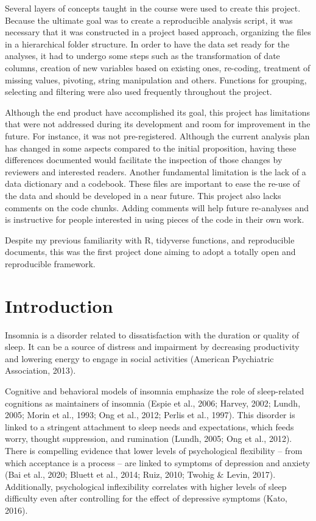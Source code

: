 \documentclass[
  letterpaper,
  DIV=11,
  numbers=noendperiod]{scrreprt}
\begin{document}

Several layers of concepts taught in the course were used to create this
project. Because the ultimate goal was to create a reproducible analysis
script, it was necessary that it was constructed in a project based
approach, organizing the files in a hierarchical folder structure. In
order to have the data set ready for the analyses, it had to undergo
some steps such as the transformation of date columns, creation of new
variables based on existing ones, re-coding, treatment of missing
values, pivoting, string manipulation and others. Functions for
grouping, selecting and filtering were also used frequently throughout
the project.

Although the end product have accomplished its goal, this project has
limitations that were not addressed during its development and room for
improvement in the future. For instance, it was not pre-registered.
Although the current analysis plan has changed in some aspects compared
to the initial proposition, having these differences documented would
facilitate the inspection of those changes by reviewers and interested
readers. Another fundamental limitation is the lack of a data dictionary
and a codebook. These files are important to ease the re-use of the data
and should be developed in a near future. This project also lacks
comments on the code chunks. Adding comments will help future
re-analyses and is instructive for people interested in using pieces of
the code in their own work.

Despite my previous familiarity with R, tidyverse functions, and
reproducible documents, this was the first project done aiming to adopt
a totally open and reproducible framework.


\hypertarget{introduction}{%
\chapter{Introduction}\label{introduction}}

Insomnia is a disorder related to dissatisfaction with the duration or
quality of sleep. It can be a source of distress and impairment by
decreasing productivity and lowering energy to engage in social
activities (American Psychiatric Association, 2013).

Cognitive and behavioral models of insomnia emphasize the role of
sleep-related cognitions as maintainers of insomnia (Espie et al., 2006;
Harvey, 2002; Lundh, 2005; Morin et al., 1993; Ong et al., 2012; Perlis
et al., 1997). This disorder is linked to a stringent attachment to
sleep needs and expectations, which feeds worry, thought suppression,
and rumination (Lundh, 2005; Ong et al., 2012). There is compelling
evidence that lower levels of psychological flexibility -- from which
acceptance is a process -- are linked to symptoms of depression and
anxiety (Bai et al., 2020; Bluett et al., 2014; Ruiz, 2010; Twohig \&
Levin, 2017). Additionally, psychological inflexibility correlates with
higher levels of sleep difficulty even after controlling for the effect
of depressive symptoms (Kato, 2016).
\end{document}
